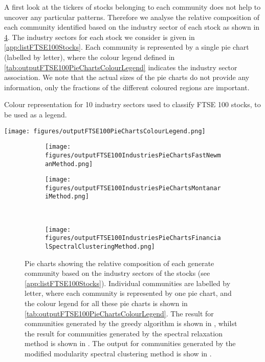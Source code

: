A first look at the tickers of stocks belonging to each community does not help to uncover any particular patterns.
Therefore we analyse the relative composition of each community identified based on the industry sector of each stock as shown in \cref{fig:outputFTSE100PieCharts}.
The industry sectors for each stock we consider is given in \cref{app:listFTSE100Stocks}.
Each community is represented by a single pie chart (labelled by letter), where the colour legend defined in \cref{tab:outputFTSE100PieChartsColourLegend} indicates the industry sector association.
We note that the actual sizes of the pie charts do not provide any information, only the fractions of the different coloured regions are important.

\begin{table}
	\caption{Colour representation for 10 industry sectors used to classify FTSE 100 stocks, to be used as a legend.}
	\label{tab:outputFTSE100PieChartsColourLegend}
	\centering
	\texttt{[image: figures/outputFTSE100PieChartsColourLegend.png]}
\end{table}

\begin{figure}
\centering
	\begin{subfigure}{.5\textwidth}
		\centering
		\texttt{[image: figures/outputFTSE100IndustriesPieChartsFastNewmanMethod.png]}
		\caption{}
		\label{fig:outputPieChartsCommunitiesGreedy}
	\end{subfigure}%
	\begin{subfigure}{.5\textwidth}
		\centering
		\texttt{[image: figures/outputFTSE100IndustriesPieChartsMontanariMethod.png]}
		\caption{}
		\label{fig:outputPieChartsCommunitiesSpectralRelaxation}
	\end{subfigure}\\
	\begin{subfigure}{.5\textwidth}
		\centering
		\texttt{[image: figures/outputFTSE100IndustriesPieChartsFinancialSpectralClusteringMethod.png]}
		\caption{}
		\label{fig:outputPieChartsCommunitiesSpectralClustering}
	\end{subfigure}
	\caption[Pie charts showing the relative composition of each generated community based on industry sectors of the FTSE 100 stocks for three different algorithms.]{\label{fig:outputFTSE100PieCharts} Pie charts showing the relative composition of each generate community based on the industry sectors of the stocks (see \cref{app:listFTSE100Stocks}). Individual communities are labelled by letter, where each community is represented by one pie chart, and the colour legend for all these pie charts is shown in \cref{tab:outputFTSE100PieChartsColourLegend}. The result for communities generated by the greedy algorithm is shown in , whilst the result for communities generated by the spectral relaxation method is shown in . The output for communities generated by the modified modularity spectral clustering method is show in .}
\end{figure}

